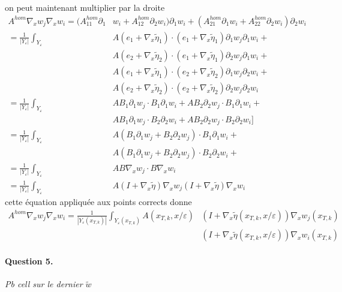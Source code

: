 \documentclass[11pt]{article}
\newcommand{\Ah}{A^{hom}}
\newcommand{\teta}{\tilde{\eta}}
\newcommand{\Ye}{Y_\varepsilon}
\newcommand{\tw}{\tilde{w}}
\newcommand{\question}[2]{\paragraph{Question #1.}\textit{#2} \\}
\begin{document}
on peut maintenant multiplier par la droite
\begin{equation}
  \begin{aligned}
    \Ah\nabla_x w_j \nabla_x w_i =(\Ah_{11} \partial_1& w_i + \Ah_{12} \partial_2 w_i) \partial_1 w_i
    + (\Ah_{21} \partial_1 w_i + \Ah_{22} \partial_2 w_i ) \partial_2 w_i \\
    = \frac{1}{|\Ye|} \int_{\Ye} &A(e_1 + \nabla_x \teta_1)\cdot(e_1 + \nabla_x \teta_1) \partial_1 w_j \partial_1 w_i + \\
    &A(e_2 + \nabla_x \teta_2)\cdot(e_1 + \nabla_x \teta_1) \partial_2 w_j \partial_1 w_i +\\ 
    &A(e_1 + \nabla_x \teta_1)\cdot(e_2 + \nabla_x \teta_2) \partial_1 w_j \partial_2 w_i +\\
    &A(e_2 + \nabla_x \teta_2)\cdot(e_2 + \nabla_x \teta_2) \partial_2 w_j \partial_2 w_i  \\
    = \frac{1}{|\Ye|} \int_{\Ye} &A B_1 \partial_1 w_j \cdot B_1 \partial_1 w_i + A B_2 \partial_2 w_j \cdot B_1 \partial_1 w_i +\\ 
    &A B_1 \partial_1 w_j \cdot B_2 \partial_2 w_i + A B_2 \partial_2 w_j \cdot B_2 \partial_2 w_i \big] \\
    = \frac{1}{|\Ye|} \int_{\Ye} &A (B_1 \partial_1 w_j + B_2 \partial_2 w_j ) \cdot B_1 \partial_1 w_i + \\
    &A (B_1 \partial_1 w_j  + B_2 \partial_2 w_j )\cdot B_2 \partial_2 w_i +\\
    = \frac{1}{|\Ye|} \int_{\Ye} &A  B\nabla_x w_j \cdot B\nabla_x w_i  \\
    = \frac{1}{|\Ye|} \int_{\Ye} &A(I + \nabla_x \teta) \nabla_x w_j (I + \nabla_x \teta) \nabla_x w_i
  \end{aligned}
\end{equation}
cette équation appliquée aux points corrects donne
\begin{equation*}
  \begin{aligned}
    \Ah\nabla_x w_j \nabla_x w_i = \frac{1}{|\Ye(x_{T, k})|} \int_{\Ye(x_{T, k})} A(x_{T, k}, x/\varepsilon)&(I + \nabla_x \teta(x_{T, k},
    x/\varepsilon)) \nabla_x w_j(x_{T, k}) \\
    &(I + \nabla_x \teta(x_{T, k}, x/\varepsilon)) \nabla_x w_i(x_{T, k})
  \end{aligned}
\end{equation*}

\question{5}{Pb cell sur le dernier $\tw$}
\end{document}
